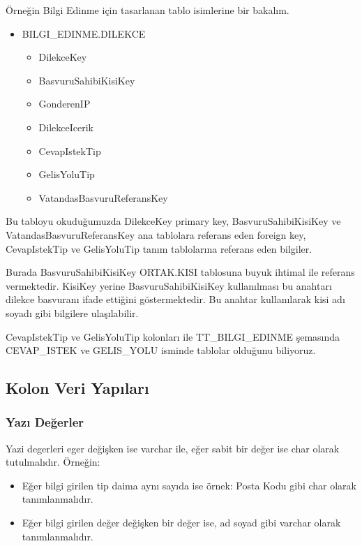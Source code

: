 \documentclass[10pt,a4paper,draft]{article}
\begin{document}
Örneğin Bilgi Edinme için tasarlanan tablo isimlerine bir bakalım.
\begin{itemize}

\item BILGI\_EDINME.DILEKCE
	\begin{itemize}
		\item DilekceKey
		\item BasvuruSahibiKisiKey
		\item GonderenIP
		\item DilekceIcerik
		\item CevapIstekTip
		\item GelisYoluTip
		\item VatandasBasvuruReferansKey
	\end{itemize}

\end{itemize}

Bu tabloyu okuduğumuzda DilekceKey primary key, 
BasvuruSahibiKisiKey ve VatandasBasvuruReferansKey ana tablolara referans eden foreign key,
CevapIstekTip ve GelisYoluTip tanım tablolarına referans eden bilgiler.

Burada BasvuruSahibiKisiKey ORTAK.KISI tablosuna buyuk ihtimal ile referans vermektedir.
KisiKey yerine BasvuruSahibiKisiKey kullanılması bu anahtarı dilekce basvuranı ifade ettiğini
göstermektedir. Bu anahtar kullanılarak kisi adı soyadı gibi bilgilere ulaşılabilir.

CevapIstekTip ve GelisYoluTip kolonları ile TT\_BILGI\_EDINME şemasında
CEVAP\_ISTEK ve GELIS\_YOLU isminde tablolar olduğunu biliyoruz.







\subsection{Kolon Veri Yapıları}

\subsubsection{Yazı Değerler}
Yazi degerleri eger değişken ise varchar ile, eğer sabit bir değer ise char olarak tutulmalıdır. Örneğin:

\begin{itemize}
\item Eğer bilgi girilen tip daima aynı sayıda ise örnek: Posta Kodu gibi char olarak tanımlanmalıdır.		 
\item Eğer bilgi girilen değer değişken bir değer ise, ad soyad gibi varchar olarak tanımlanmalıdır.
\end{itemize} 
\end{document}
